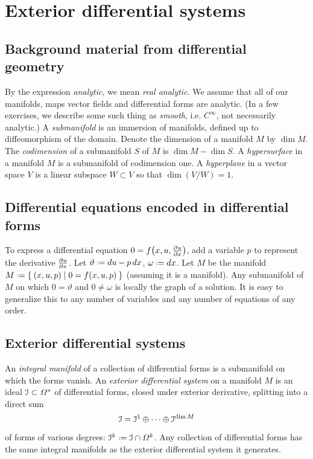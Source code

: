\chapter{Exterior differential systems}\label{chapter:eds}

\section{Background material from differential geometry}
By the expression \emph{analytic}, we mean \emph{real analytic}.
We assume that all of our manifolds, maps vector fields and differential forms are analytic.
(In a few exercises, we describe some such thing as \emph{smooth}, i.e. \(C^{\infty}\), not necessarily analytic.)
A \emph{submanifold} is an immersion of manifolds, defined up to diffeomorphism of the domain.
Denote the dimension of a manifold \(M\) by \(\dim M\).
The \emph{codimension} of a submanifold \(S\) of \(M\) is \(\dim M - \dim S\).
A \emph{hypersurface} in a manifold \(M\) is a submanifold of codimension one.
A \emph{hyperplane} in a vector space \(V\) is a linear subspace \(W\subset V\) so that \(\dim (V/W)=1\).


\section{Differential equations encoded in differential forms}
To express a differential equation \(0=f\of{x,u,\pderiv{u}{x}}\), add a variable \(p\) to represent the derivative \(\pderiv{u}{x}\).
Let \(\vartheta\defeq du-p \, dx\), \(\omega\defeq dx\). Let \(M\) be the manifold \(M\defeq\Set{(x,u,p)|0=f\of{x,u,p}}\) (assuming it is a manifold).
Any submanifold of \(M\) on which \(0=\vartheta\) and \(0\ne \omega\) is locally the graph of a solution.
It is easy to generalize this to any number of variables and any number of equations of any order.

\section{Exterior differential systems}
An \emph{integral manifold} of a collection of differential forms is a submanifold on which the forms vanish.
An \emph{exterior differential system} on a manifold \(M\) is an ideal \(\mathcal{I} \subset \Omega^*\) of differential forms, closed under exterior derivative, splitting into a direct sum
\[
\mathcal{I}=\mathcal{I}^1 \oplus \dots \oplus \mathcal{I}^{\dim M}
\]
of forms of various degrees: \(\II^k \defeq \II \cap \Omega^k\).
Any collection of differential forms has the same integral manifolds as the exterior differential system it generates.


